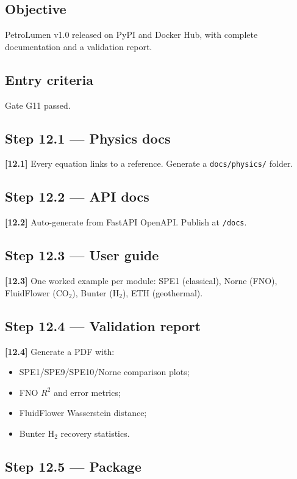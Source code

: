 \documentclass[10pt,a4paper]{article}
\newcommand{\stepID}[1]{\textsf{\textbf{[#1]}}}
\newcommand{\file}[1]{\texttt{#1}}
\begin{document}
\subsection{Objective}
PetroLumen v1.0 released on PyPI and Docker Hub, with complete documentation and a validation report.

\subsection{Entry criteria}
Gate G11 passed.

\subsection{Step 12.1 --- Physics docs}

\stepID{12.1} Every equation links to a reference. Generate a \file{docs/physics/} folder.

\subsection{Step 12.2 --- API docs}

\stepID{12.2} Auto-generate from FastAPI OpenAPI. Publish at \file{/docs}.

\subsection{Step 12.3 --- User guide}

\stepID{12.3} One worked example per module: SPE1 (classical), Norne (FNO), FluidFlower (CO$_2$), Bunter (H$_2$), ETH (geothermal).

\subsection{Step 12.4 --- Validation report}

\stepID{12.4} Generate a PDF with:

\begin{itemize}[leftmargin=1.4em]
  \item SPE1/SPE9/SPE10/Norne comparison plots;
  \item FNO $R^2$ and error metrics;
  \item FluidFlower Wasserstein distance;
  \item Bunter H$_2$ recovery statistics.
\end{itemize}

\subsection{Step 12.5 --- Package}
\end{document}
